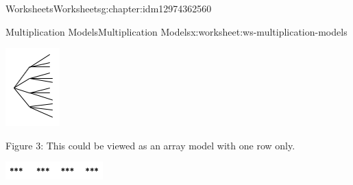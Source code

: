 \documentclass[twoside,11pt,]{book}
\begin{document}
\begin{chapterptx}{Worksheets}{}{Worksheets}{}{}{g:chapter:idm12974362560}
\begin{worksheet-section-numberless}{Multiplication Models}{}{Multiplication Models}{}{}{x:worksheet:ws-multiplication-models}
\begin{introduction}{}
\begin{description}
\begin{sidebyside}{1}{0.45}{0.45}{0}
\begin{sbspanel}{0.1}
\includegraphics[width=1\linewidth]{images/mult-tree.png}
\end{sbspanel}%
\end{sidebyside}%
\item[{}]Figure 3: This could be viewed as an array model with one row only. \begin{sidebyside}{1}{0.3}{0.3}{0}%
\begin{sbspanel}{0.4}%
\includegraphics[width=1\linewidth]{images/mult-one-row.png}
\end{sbspanel}%
\end{sidebyside}%

\end{description}
\end{introduction}
\end{worksheet-section-numberless}
\end{chapterptx}
\end{document}
